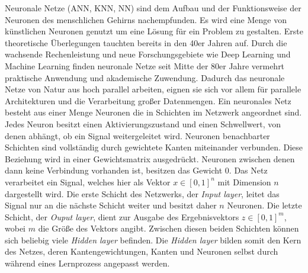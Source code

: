 Neuronale Netze (ANN, KNN, NN) sind dem Aufbau und der Funktionsweise der Neuronen des menschlichen Gehirns nachempfunden. Es wird eine Menge von künstlichen Neuronen genutzt um eine Lösung für ein Problem zu gestalten. Erste theoretische Überlegungen tauchten bereits in den 40er Jahren auf. Durch die wachsende Rechenleistung und neue Forschungsgebiete wie Deep Learning und Machine Learning finden neuronale Netze seit Mitte der 80er Jahre vermehrt praktische Anwendung und akademische Zuwendung. Dadurch das neuronale Netze von Natur aus hoch parallel arbeiten, eignen sie sich vor allem für parallele Architekturen und die Verarbeitung großer Datenmengen. 
Ein neuronales Netz besteht aus einer Menge Neuronen die in Schichten im Netzwerk angeordnet sind. Jedes Neuron besitzt einen Aktivierungszustand und einen Schwellwert, von denen abhängt, ob ein Signal weitergeleitet wird. Neuronen benachbarter Schichten sind vollständig durch gewichtete Kanten miteinander verbunden. Diese Beziehung wird in einer Gewichtsmatrix ausgedrückt. Neuronen zwischen denen dann keine Verbindung vorhanden ist, besitzen das Gewicht 0. 
Das Netz verarbeitet ein Signal, welches hier als Vektor $x \in [0,1]^n$ mit Dimension $n$ dargestellt wird. Die erste Schicht des Netzwerks, der \textit{Input layer}, leitet das Signal nur an die nächste Schicht weiter und besitzt daher $n$ Neuronen. Die letzte Schicht, der \textit{Ouput layer}, dient zur Ausgabe des Ergebnisvektors $z \in [0,1]^m$, wobei $m$ die Größe des Vektors angibt. Zwischen diesen beiden Schichten können sich beliebig viele \textit{Hidden layer} befinden. Die \textit{Hidden layer} bilden somit den Kern des Netzes, deren Kantengewichtungen, Kanten und Neuronen selbst durch während eines Lernprozess angepasst werden.

